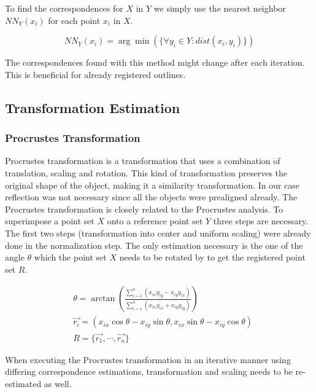 \documentclass[pdftex,12pt,a4paper]{report}
\begin{document}
To find the correspondences for $X$ in $Y$ we simply use the nearest neighbor $NN_Y(x_i)$ for each point $x_i$ in $X$.

\begin{equation}
NN_Y(x_i) = \arg\min(\{ \forall y_i \in Y: dist(x_i, y_i) \})
\end{equation}

The correspondences found with this method might change after each iteration. This is beneficial for already registered
outlines.

\subsection{Transformation Estimation}

\subsubsection{Procrustes Transformation}
\label{subsub:procrustes}

Procrustes transformation is a transformation that uses a combination of translation, scaling and rotation. This kind of
transformation preserves the original shape of the object, making it a similarity transformation. In our case reflection
was not necessary since all the objects were prealigned already. The Procrustes transformation is closely related to the
Procrustes analysis. To superimpose a point set $X$ onto a reference point set $Y$ three steps are necessary. The first
two steps (transformation into center and uniform scaling) were already done in the normalization step. The only
estimation necessary is the one of the angle $\theta$ which the point set $X$ needs to be rotated by to get the registered
point set $R$.

\begin{equation}
\begin{split}
& \theta = \arctan{\left( \frac{\sum\limits_{i = 1}^n(x_{ix}y_{iy} - x_{iy} y_{ix})}{\sum\limits_{i = 1}^n (x_{ix} y_{ix} + x_{iy} y_{iy}) } \right)} \\
& \vec{r_i} = { (x_{ix} \cos\theta - x_{iy} \sin\theta, x_{ix} \sin\theta - x_{iy} \cos\theta) } \\
& R = \{ \vec{r_1}, \cdots, \vec{r_n} \}
\end{split}
\end{equation}

When executing the Procrustes transformation in an iterative manner using differing correspondence estimations,
transformation and scaling needs to be re-estimated as well.
\end{document}

